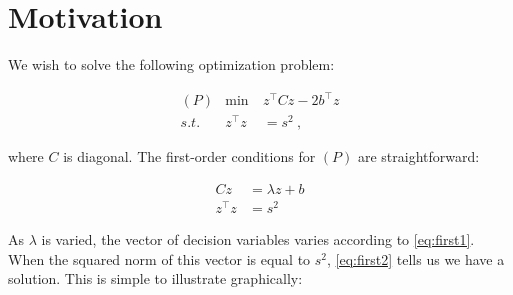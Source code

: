 \documentclass[10pt,letterpaper]{article}
\begin{document}

\section*{Motivation}
We wish to solve the following optimization problem:


\begin{align*}
&(P) &\min~ & z^\top C z - 2b^\top z & \\
& s.t. & z^\top z &= s^2~,
\end{align*}


where $C$ is diagonal. The first-order conditions for $(P)$ are straightforward:


\begin{subequations}
\begin{align}
\label{eq:first1}Cz &= \lambda z + b \\
\label{eq:first2}z^\top z &= s^2
\end{align}
\end{subequations}

As $\lambda$ is varied, the vector of decision variables varies according to \eqref{eq:first1}. When the squared norm of this vector is equal to $s^2$, \eqref{eq:first2} tells us we have a solution. This is simple to illustrate graphically:
\end{document}
